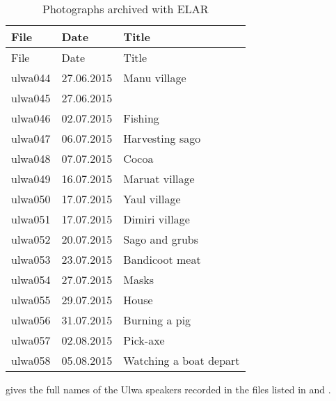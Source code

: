 \begin{xltabular}{\textwidth}{llQ}
\caption{\label{tab:photos} Photographs archived with ELAR}\\
\lsptoprule
		File & Date & Title\\
		\midrule\endfirsthead
    \midrule
    File & Date & Title\\
		\midrule\endhead
    \midrule\endfoot
    \lspbottomrule
    \endlastfoot

ulwa044 & 27.06.2015 & Manu village\\
ulwa045 & 27.06.2015 & \\
ulwa046 & 02.07.2015 & Fishing\\
ulwa047 & 06.07.2015 & Harvesting sago\\
ulwa048 & 07.07.2015 & Cocoa\\
ulwa049 & 16.07.2015 & Maruat village\\
ulwa050 & 17.07.2015 & Yaul village\\
ulwa051 & 17.07.2015 & Dimiri village\\
ulwa052 & 20.07.2015 & Sago and grubs\\
ulwa053 & 23.07.2015 & Bandicoot meat\\
ulwa054 & 27.07.2015 & Masks\\
ulwa055 & 29.07.2015 & House\\
ulwa056 & 31.07.2015 & Burning a pig\\
ulwa057 & 02.08.2015 & Pick-axe\\
ulwa058 & 05.08.2015 & Watching a boat depart\\
\end{xltabular}



 gives the full names of the Ulwa speakers recorded in the files listed in  and .



